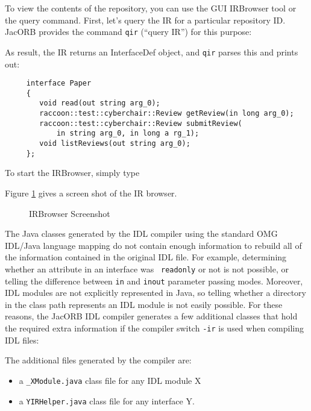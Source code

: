 \documentclass[12pt]{scrbook}
\begin{document}
To view the contents of the repository, you can use the GUI IRBrowser
tool or the query command. First, let's query the IR for a particular
repository ID. JacORB provides the command {\tt qir} (``query IR'')
for this purpose:


As result, the IR returns an InterfaceDef object, and {\tt qir} parses
this and prints out:

\begin{verbatim}
     interface Paper
     {
        void read(out string arg_0);
        raccoon::test::cyberchair::Review getReview(in long arg_0);
        raccoon::test::cyberchair::Review submitReview(
            in string arg_0, in long a rg_1);
        void listReviews(out string arg_0);
     };
\end{verbatim}

To start the IRBrowser, simply type


Figure \ref{fig:IRBrowser} gives a screen shot of the IR browser.

\bigskip
\begin{figure}[htb]
\centerline{}
\caption{IRBrowser Screenshot}
\label{fig:IRBrowser}
\end{figure}

The Java classes generated by  the IDL compiler using the standard OMG
IDL/Java language mapping do not contain enough information to rebuild
all  of the  information contained  in  the original  IDL file.   For
example,  determining whether an  attribute in  an interface  was {\tt
readonly} or  not is not  possible, or telling the  difference between
{\tt  in}  and {\tt  inout}  parameter  passing  modes. Moreover,  IDL
modules are not  explicitly represented in Java, so  telling whether a
directory in  the class  path represents an  IDL module is  not easily
possible. For these  reasons, the JacORB IDL compiler  generates a few
additional  classes that hold  the required  extra information  if the
compiler switch {\tt -ir} is used when compiling IDL files:


The additional files generated by the compiler are:
\begin{itemize}
\item a {\tt \_XModule.java} class file for any IDL module X
\item a {\tt YIRHelper.java} class file for any interface Y.
\end{itemize}
\end{document}
